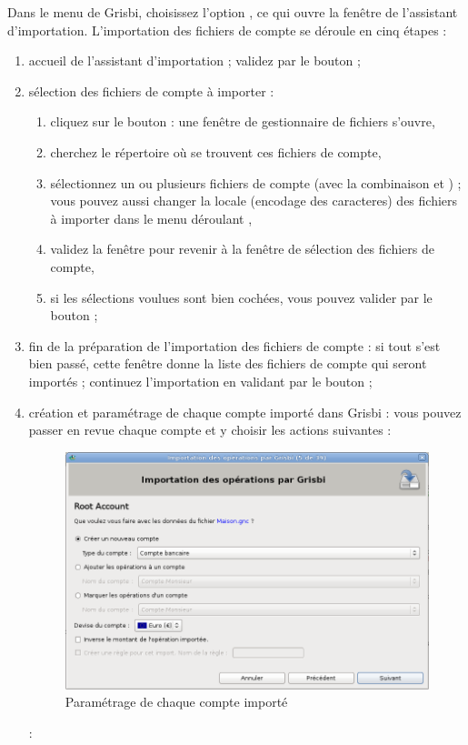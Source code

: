Dans le menu  de Grisbi, choisissez l'option , ce qui ouvre la fenêtre de l'assistant d'importation. L'importation des fichiers de compte se déroule en cinq étapes :

\begin{enumerate}
	\item accueil de l'assistant d'importation ; validez par le bouton  ;
	\item sélection des fichiers de compte à importer :	
		\begin{enumerate}
			\item cliquez sur le bouton  : une fenêtre de gestionnaire de fichiers s'ouvre,	
			\item cherchez le répertoire où se trouvent ces fichiers de compte,
			\item sélectionnez un ou plusieurs fichiers de compte (avec la combinaison   et ) ; vous pouvez aussi changer la \gls{locale} (\gls{encodage des caracteres}) des fichiers à importer dans le menu déroulant ,
			\item validez la fenêtre pour revenir à la fenêtre de sélection des fichiers de compte,
			\item si les sélections voulues sont bien cochées, vous pouvez valider par le bouton  ;
		\end{enumerate}		  
	\item fin de la préparation de l'importation des fichiers de compte : si tout s'est bien passé, cette fenêtre donne la liste des fichiers de compte qui seront importés ; continuez l'importation en validant par le bouton  ;
	\item création et paramétrage de chaque compte importé dans Grisbi : vous pouvez passer en revue chaque compte et y choisir les actions suivantes \ifIllustration {} :
	\begin{figure}[htbp]
	\begin{center}
	\includegraphics[scale=0.5]{image/screenshot/QIF_import_files_setup}
	\end{center}
	\caption{Paramétrage de chaque compte importé}
	\label{QIF-import-files-setup-img}
	\end{figure}
	\else  :
	\fi
	

\end{enumerate}
